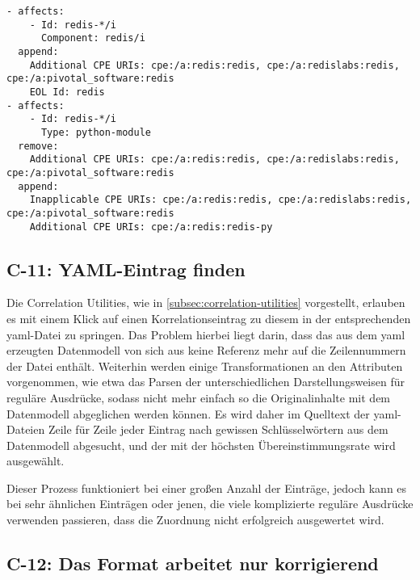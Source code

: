 \begin{lstlisting}[style=yaml,caption={Korrelationseinträge in zwei unterschiedlichen Dateien, die aufeinander aufbauen},label={lst:correlation-order-depdendency-example}]
- affects:
    - Id: redis-*/i
      Component: redis/i
  append:
    Additional CPE URIs: cpe:/a:redis:redis, cpe:/a:redislabs:redis, cpe:/a:pivotal_software:redis
    EOL Id: redis
- affects:
    - Id: redis-*/i
      Type: python-module
  remove:
    Additional CPE URIs: cpe:/a:redis:redis, cpe:/a:redislabs:redis, cpe:/a:pivotal_software:redis
  append:
    Inapplicable CPE URIs: cpe:/a:redis:redis, cpe:/a:redislabs:redis, cpe:/a:pivotal_software:redis
    Additional CPE URIs: cpe:/a:redis:redis-py
\end{lstlisting}

\subsection{C-11: YAML-Eintrag finden}\label{subsec:c-11-finding-yaml-entries}

Die Correlation Utilities, wie in \autoref{subsec:correlation-utilities} vorgestellt, erlauben es mit einem Klick auf einen Korrelationseintrag zu diesem in der entsprechenden \acrshort{yaml}-Datei zu springen.
Das Problem hierbei liegt darin, dass das aus dem \acrshort{yaml} erzeugten Datenmodell von sich aus keine Referenz mehr auf die Zeilennummern der Datei enthält.
Weiterhin werden einige Transformationen an den Attributen vorgenommen, wie etwa das Parsen der unterschiedlichen Darstellungsweisen für reguläre Ausdrücke, sodass nicht mehr einfach so die Originalinhalte mit dem Datenmodell abgeglichen werden können.
Es wird daher im Quelltext der \acrshort{yaml}-Dateien Zeile für Zeile jeder Eintrag nach gewissen Schlüsselwörtern aus dem Datenmodell abgesucht, und der mit der höchsten Übereinstimmungsrate wird ausgewählt.

Dieser Prozess funktioniert bei einer großen Anzahl der Einträge, jedoch kann es bei sehr ähnlichen Einträgen oder jenen, die viele komplizierte reguläre Ausdrücke verwenden passieren, dass die Zuordnung nicht erfolgreich ausgewertet wird.

\subsection{C-12: Das Format arbeitet nur korrigierend}\label{subsec:c-12-format-nur-korrigierend}

